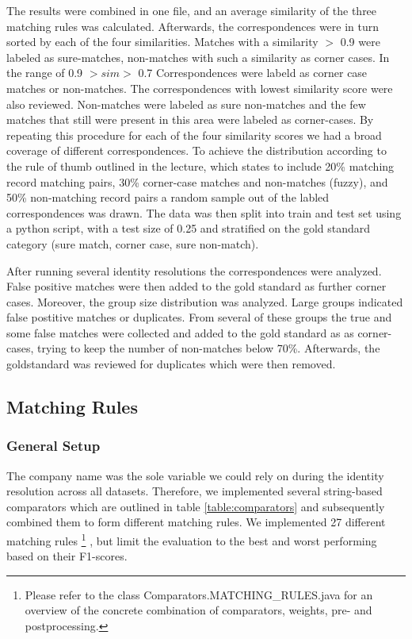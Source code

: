 \documentclass[11pt,titlepage,oneside,openany]{article}
\begin{document}
The results were combined in one file, and an average similarity of the three matching rules was calculated. Afterwards, the correspondences were in turn sorted by each of the four similarities. Matches with a similarity $>$ 0.9 were labeled as sure-matches, non-matches with such a similarity as corner cases. In the range of 0.9 $> sim >$ 0.7 Correspondences were labeld as corner case matches or non-matches. The correspondences with lowest similarity score were also reviewed. Non-matches were labeled as sure non-matches and the few matches that still were present in this area were labeled as corner-cases. By repeating this procedure for each of the four similarity scores we had a broad coverage of different correspondences. To achieve the distribution according to the rule of thumb outlined in the lecture, which states to include 20\% matching record matching pairs, 30\% corner-case matches and non-matches (fuzzy), and 50\% non-matching record pairs a random sample out of the labled correspondences was drawn.
The data was then split into train and test set using a python script, with a test size of 0.25 and stratified on the gold standard category (sure match, corner case, sure non-match).


After running several identity resolutions the correspondences were analyzed. False positive matches were then added to the gold standard as further corner cases. Moreover, the group size distribution was analyzed. Large groups indicated false postitive matches or duplicates. From several of these groups the true and some false matches were collected and added to the gold standard as as corner-cases, trying to keep the number of non-matches below 70\%. Afterwards, the goldstandard was reviewed for duplicates which were then removed.

\subsection{Matching Rules}
\label{sec:matching-rules}

\subsubsection{General Setup}
The company name was the sole variable we could rely on during the identity resolution across all datasets. Therefore, we implemented several string-based comparators which are outlined in table \ref{table:comparators} and subsequently combined them to form different matching rules. We implemented 27 different matching rules%
\footnote{Please refer to the class Comparators.MATCHING\_RULES.java for an overview of the concrete combination of comparators, weights, pre- and postprocessing.}%
, but limit the evaluation to the best and worst performing based on their F1-scores.
\end{document}
